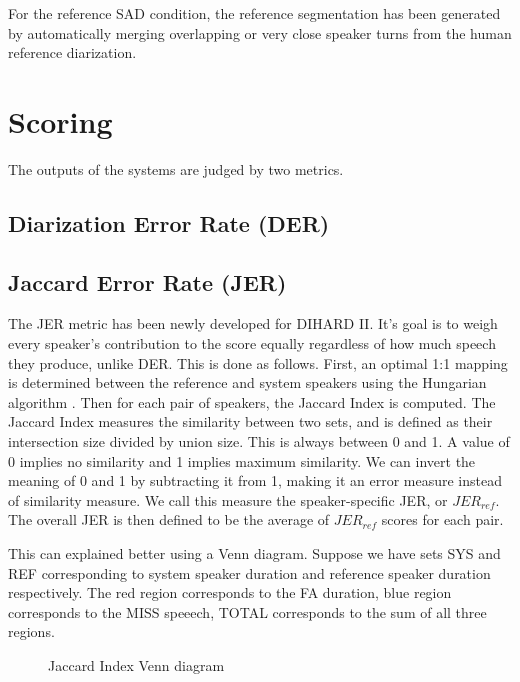 For the reference SAD condition, the reference segmentation has been generated by automatically merging overlapping or very close speaker turns from the human reference diarization.

\section{Scoring}
The outputs of the systems are judged by two metrics.

	\subsection{Diarization Error Rate (DER)}

		
	\subsection{Jaccard Error Rate (JER)}
	The JER metric has been newly developed for DIHARD II. It's goal is to weigh every speaker's contribution to the score equally regardless of how much speech they produce, unlike DER. This is done as follows.
	First, an optimal 1:1 mapping is determined between the reference and system speakers using the Hungarian algorithm \cite{hungarian}. Then for each pair of speakers, the Jaccard Index \cite{hamers1989similarity} is computed. The Jaccard Index measures the similarity between two sets, and is defined as their intersection size divided by union size. This is always between 0 and 1. A value of 0 implies no similarity and 1 implies maximum similarity. We can invert the meaning of 0 and 1 by subtracting it from 1, making it an error measure instead of similarity measure. We call this measure the speaker-specific JER, or $JER_{ref}$. The overall JER is then defined to be the average of $JER_{ref}$ scores for each pair.
	
	This can explained better using a Venn diagram. Suppose we have sets SYS and REF corresponding to system speaker duration and reference speaker duration respectively. The red region corresponds to the FA duration, blue region corresponds to the MISS speeech, TOTAL corresponds to the sum of all three regions.
	
	\begin{figure}[h]
		\centering
		\def\syscircle{(0,0) circle (1.5cm)}
		\def\refcircle{(0:2cm) circle (1.5cm)}
		\caption{Jaccard Index Venn diagram}
	\end{figure}
	
